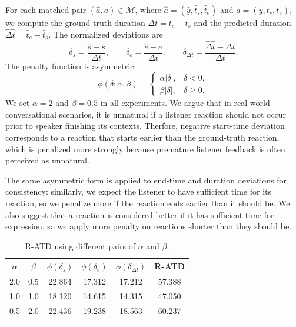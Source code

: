 For each matched pair $(\widehat{a},a)\in\mathcal{M}$, where $\widehat{a}=(\widehat{y},\widehat{t}_s,\widehat{t}_e)$ and $a=(y,t_s,t_e)$, we compute the ground-truth duration $\Delta t=t_e-t_s$ and the predicted duration $\widehat{\Delta t}=\widehat{t}_e-\widehat{t}_s$. The normalized deviations are
\begin{equation}
    \delta_s=\frac{\widehat{s}-s}{\Delta t}, \qquad
    \delta_e=\frac{\widehat{e}-e}{\Delta t}, \qquad
    \delta_{\Delta t}=\frac{\widehat{\Delta t}-\Delta t}{\Delta t}.
\end{equation}
The penalty function is asymmetric:
\begin{equation}
    \phi(\delta;\alpha,\beta)=
    \begin{cases}
        \alpha|\delta|, & \delta<0, \\
        \beta|\delta|, & \delta\geq0.
    \end{cases}
\end{equation}
We set $\alpha=2$ and $\beta=0.5$ in all experiments. We argue that in real-world conversational scenarios, it is unnatural if a listener reaction should not occur prior to speaker finishing its contexts. Therfore, negative start-time deviation corresponds to a reaction that starts earlier than the ground-truth reaction, which is penalized more strongly because premature listener feedback is often perceived as unnatural. 

The same asymmetric form is applied to end-time and duration deviations for consistency: similarly, we expect the listener to have sufficient time for its reaction, so we penalize more if the reaction ends earlier than it should be. We also suggest that a reaction is considered better if it has sufficient time for expression, so we apply more penalty on reactions shorter than they should be.


\begin{table}[t]
    \centering
    \small
    \caption{R-ATD using different pairs of $\alpha$ and $\beta$.}
    \label{tab:r-atd}
    \begin{tabular}{cc|cccc}
        \Xhline{1.2pt}
        $\alpha$ & $\beta$ & $\phi(\delta_s)$ & $\phi(\delta_e)$ & $\phi(\delta_{\Delta t})$ & R-ATD \\
        \hline
        2.0 & 0.5 & 22.864 & 17.312 & 17.212 & 57.388 \\
        1.0 & 1.0 & 18.120 & 14.615 & 14.315 & 47.050 \\
        0.5 & 2.0 & 22.436 & 19.238 & 18.563 & 60.237 \\
        \Xhline{1.2pt}
    \end{tabular}
    \vspace{-1em}
\end{table}

